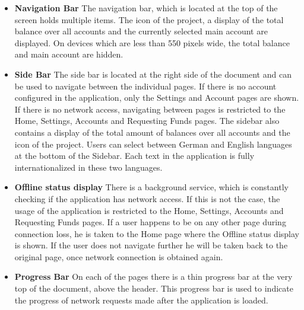 \begin{itemize}
\item \textbf{Navigation Bar}
The navigation bar, which is located at the top of the screen holds multiple items. The icon of the project, a display of the total balance over all accounts and the currently selected main account are displayed. 
On devices which are less than 550 pixels wide, the total balance and main account are hidden.
\item \textbf{Side Bar}
The side bar is located at the right side of the document and can be used to navigate between the individual pages. If there is no account configured in the application, only the Settings and Account pages are shown. If there is no network access, navigating between pages is restricted to the Home, Settings, Accounts and Requesting Funds pages.
The sidebar also contains a display of the total amount of balances over all accounts and the icon of the project. Users can select between German and English languages at the bottom of the Sidebar. Each text in the application is fully internationalized in these two languages.

\item \textbf{Offline status display}
There is a background service, which is constantly checking if the application has network access. If this is not the case, the usage of the application is restricted to the Home, Settings, Accounts and Requesting Funds pages. If a user happens to be on any other page during connection loss, he is taken to the Home page where the Offline status display is shown. If the user does not navigate further he will be taken back to the original page, once network connection is obtained again.
\item \textbf{Progress Bar}
On each of the pages there is a thin progress bar at the very top of the document, above the header. This progress bar is used to indicate the progress of network requests made after the application is loaded.

\end{itemize}

